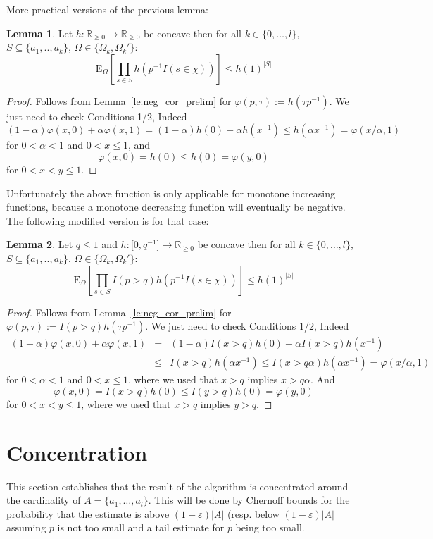 \documentclass{article}
\newcommand{\expectation}{\mathrm{E}}
\newcommand{\eps}{\varepsilon}
\renewcommand{\phi}{\varphi}
\theoremstyle{definition}
\newtheorem{lemma}{Lemma}
\begin{document}
More practical versions of the previous lemma:
\begin{lemma}\label{le:neg_cor_pos}
Let $h : \mathbb R_{\geq 0} \rightarrow \mathbb R_{\geq 0}$ be concave then for all 
$k \in \{0,\ldots,l\}$, $S \subseteq \{a_1,..,a_k\}$, $\Omega \in \{\Omega_k,\Omega_k'\}$:
\[
  \expectation_{\Omega}\left[ \prod_{s \in S} h(p^{-1} I(s \in \chi)) \right] \leq h(1)^{|S|} 
\]
\end{lemma}
\begin{proof}
Follows from Lemma~\ref{le:neg_cor_prelim} for $\phi(p,\tau) := h(\tau p^{-1})$. We just need to check Conditions 1/2, Indeed
\[
  (1-\alpha) \phi(x,0) + \alpha \phi(x,1) = (1-\alpha) h(0) + \alpha h(x^{-1}) \leq h(\alpha x^{-1}) = \phi(x/\alpha,1)
\]
for $0 < \alpha < 1$ and $0< x \leq 1$, and
\[
  \phi(x,0) = h(0) \leq h(0) = \phi(y,0)
\]
for $0 < x < y \leq 1$.
\end{proof}

Unfortunately the above function is only applicable for monotone increasing functions, because a monotone decreasing function
will eventually be negative. The following modified version is for that case:

\begin{lemma}\label{le:neg_cor_neg}
Let $q \leq 1$ and $h : \mathbb [0,q^{-1}] \rightarrow \mathbb R_{\geq 0}$ be concave then for all 
$k \in \{0,\ldots,l\}$, $S \subseteq \{a_1,..,a_k\}$, $\Omega \in \{\Omega_k,\Omega_k'\}$:
\[
  \expectation_{\Omega}\left[ \prod_{s \in S} I(p > q) h(p^{-1} I(s \in \chi)) \right] \leq h(1)^{|S|} 
\]
\end{lemma}
\begin{proof}
Follows from Lemma~\ref{le:neg_cor_prelim} for $\phi(p,\tau) := I(p > q) h(\tau p^{-1})$. We just need to check Conditions 1/2, Indeed
\begin{eqnarray*}
  (1-\alpha) \phi(x,0) + \alpha \phi(x,1) & = & (1-\alpha) I(x>q) h(0) + \alpha I(x > q) h(x^{-1}) \\
   & \leq & I(x > q) h(\alpha x^{-1}) \leq I(x > q \alpha) h(\alpha x^{-1}) = \phi(x/\alpha,1)
\end{eqnarray*}
for $0 < \alpha < 1$ and $0< x \leq 1$, where we used that $x > q$ implies $x > q \alpha$. And
\[
  \phi(x,0) = I(x>q) h(0) \leq I(y > q) h(0) = \phi(y,0)
\]
for $0 < x < y \leq 1$, where we used that $x > q$ implies $y > q$.
\end{proof}

\section{Concentration}
This section establishes that the result of the algorithm is concentrated around the cardinality of $A = \{ a_1, \ldots, a_l \}$. This will be done by Chernoff bounds for the probability that the estimate is above $(1+\eps)|A|$ (resp. below $(1-\eps)|A|$ assuming $p$ is not too small and a tail estimate for $p$ being too small.
\end{document}
